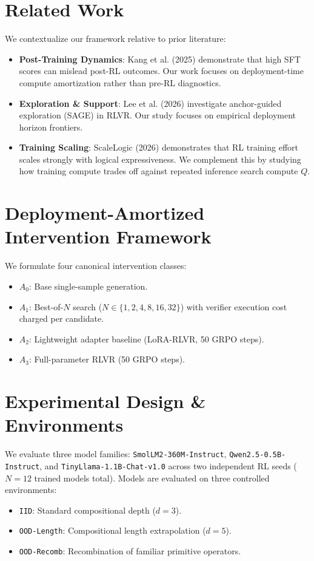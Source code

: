 \documentclass[11pt]{article}
\begin{document}
\section{Related Work}
We contextualize our framework relative to prior literature:
\begin{itemize}
    \item \textbf{Post-Training Dynamics}: Kang et al. (2025) demonstrate that high SFT scores can mislead post-RL outcomes. Our work focuses on deployment-time compute amortization rather than pre-RL diagnostics.
    \item \textbf{Exploration \& Support}: Lee et al. (2026) investigate anchor-guided exploration (SAGE) in RLVR. Our study focuses on empirical deployment horizon frontiers.
    \item \textbf{Training Scaling}: ScaleLogic (2026) demonstrates that RL training effort scales strongly with logical expressiveness. We complement this by studying how training compute trades off against repeated inference search compute $Q$.
\end{itemize}

\section{Deployment-Amortized Intervention Framework}
We formulate four canonical intervention classes:
\begin{itemize}
    \item $A_0$: Base single-sample generation.
    \item $A_1$: Best-of-$N$ search ($N \in \{1, 2, 4, 8, 16, 32\}$) with verifier execution cost charged per candidate.
    \item $A_2$: Lightweight adapter baseline (LoRA-RLVR, 50 GRPO steps).
    \item $A_3$: Full-parameter RLVR (50 GRPO steps).
\end{itemize}

\section{Experimental Design \& Environments}
We evaluate three model families: \texttt{SmolLM2-360M-Instruct}, \texttt{Qwen2.5-0.5B-Instruct}, and \texttt{TinyLlama-1.1B-Chat-v1.0} across two independent RL seeds ($N=12$ trained models total). Models are evaluated on three controlled environments:
\begin{itemize}
    \item \texttt{IID}: Standard compositional depth ($d=3$).
    \item \texttt{OOD-Length}: Compositional length extrapolation ($d=5$).
    \item \texttt{OOD-Recomb}: Recombination of familiar primitive operators.
\end{itemize}
\end{document}
